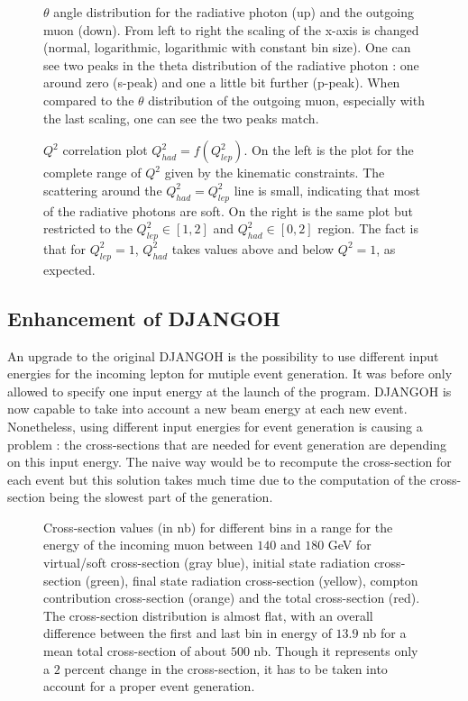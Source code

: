 \begin{figure}[htb]
\centerline{}
\caption{$\theta$ angle distribution for the radiative photon (up) and the outgoing muon (down). From left to right the scaling of the x-axis is changed (normal, logarithmic, logarithmic with constant bin size). One can see two peaks in the theta distribution of the radiative photon : one around zero (s-peak) and one a little bit further (p-peak). When compared to the $\theta$ distribution of the outgoing muon, especially with the last scaling, one can see the two peaks match.}\label{fig:anglesp}
 \end{figure}
\hfill
\begin{figure}[htb]
\centerline{}
\caption{$Q^2$ correlation plot $Q^2_{had}=f(Q^2_{lep})$. On the left is the plot for the complete range of $Q^2$
given by the kinematic constraints. The scattering around the $Q^2_{had} = Q^2_{lep}$ line is small, indicating that
most of the radiative photons are soft. On the right is the same plot but restricted to the $Q^2_{lep}\in[1,2]$ and
$Q^2_{had}\in[0,2]$ region. The fact is that for $Q^2_{lep}=1$, $Q^2_{had}$ takes values above and below $Q^2=1$, as expected.}\label{fig:Q2corr}
\end{figure}

\subsection{Enhancement of DJANGOH}

An upgrade to the original DJANGOH is the possibility to use different input energies for the incoming lepton for mutiple event generation. It was before only allowed to specify one input energy at the launch of the program. DJANGOH is now capable to take into account a new beam energy at each new event. Nonetheless, using different input energies for event generation is causing a problem : the cross-sections that are needed for event generation are depending on this input energy. The naive way would be to recompute the cross-section for each event but this solution takes much time due to the computation of the cross-section being the slowest part of the generation.

\begin{figure}[htb]
\centerline{}
\caption{Cross-section values (in nb) for different bins in a range for the energy of the incoming muon between $140$ and $180$ GeV for virtual/soft cross-section (gray blue), initial state radiation cross-section (green), final state radiation cross-section (yellow), compton contribution cross-section (orange) and the total cross-section (red). The cross-section distribution is almost flat, with an overall difference between the first and last bin in energy of $13.9$ nb for a mean total cross-section of about $500$ nb. Though it represents only a $2$ percent change in the cross-section, it has to be taken into account for a proper event generation.}\label{fig:gridxs}
\end{figure}

